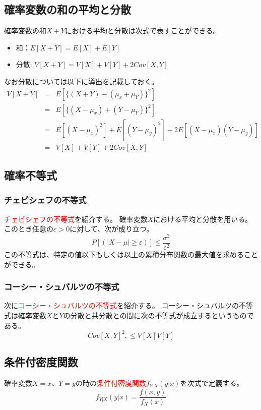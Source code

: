 \documentclass[a4paper,10pt]{jarticle}
\begin{document}
\subsection{確率変数の和の平均と分散}
確率変数の和$X+Y$における平均と分散は次式で表すことができる。
\begin{itemize}
    \item 和：$E[X+Y] = E[X]+E[Y]$
    \item 分散: $V[X+Y] = V[X]+V[Y] + 2Cov[X,Y]$
\end{itemize}
なお分散については以下に導出を記載しておく。
\begin{eqnarray*}
    V[X+Y] &=& E[\{(X+Y)-(\mu_x+\mu_Y)\}^2]\\
            &=& E[\{(X-\mu_x)+(Y-\mu_Y)\}^2]\\
            &=& E[(X-\mu_x)^2]+E[(Y-\mu_y)^2]+2E[(X-\mu_x)(Y-\mu_y)]\\
            &=& V[X]+V[Y]+2Cov[X,Y]
\end{eqnarray*}
\subsection{確率不等式}
\subsubsection{チェビシェフの不等式}
\textcolor{red}{チェビシェフの不等式}を紹介する。
確率変数$X$における平均と分散を用いる。このとき任意の$\varepsilon >0$に対して、次が成り立つ。
\begin{equation}
    P[(|X-\mu|\geq\varepsilon)]\leq \frac{\sigma^2}{\varepsilon^2}\tag{2,20}
\end{equation}
この不等式は、特定の値以下もしくは以上の累積分布関数の最大値を求めることができる。
\subsubsection{コーシー・シュバルツの不等式}
次に\textcolor{red}{コーシー・シュバルツの不等式}を紹介する。
コーシー・シュバルツの不等式は確率変数$X$と$Y$の分散と共分散との間に次の不等式が成立するというものである。
\begin{equation}
    Cov[X,Y] ^2,\leq V[X]V[Y]\tag{2,21}
\end{equation}
\subsection{条件付密度関数}
確率変数$X=x$、$Y=y$の時の\textcolor{red}{条件付密度関数}$f_{Y|X}(y|x)$を次式で定義する。
\begin{equation}
    f_{Y|X}(y|x)=\frac{f(x,y)}{f_X(x)}\tag{2,22}
\end{equation}
\end{document}
